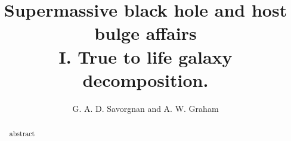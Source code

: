 \documentclass[preprint2]{emulateapj}
\begin{document}
\title{Supermassive black hole and host bulge affairs \\ I. True to life galaxy decomposition.}

\author{G. A. D. Savorgnan and A. W. Graham}






\begin{abstract}
abstract %
\end{abstract}

\end{document}
